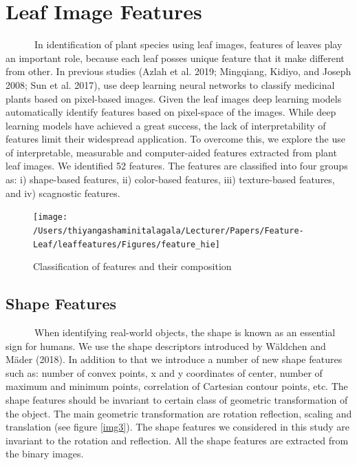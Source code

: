 \documentclass{article}
\begin{document}
\hypertarget{leaf-image-features}{%
\section{Leaf Image Features}\label{leaf-image-features}}

~~~~~~In identification of plant species using leaf images, features of
leaves play an important role, because each leaf posses unique feature
that it make different from other. In previous studies (Azlah et al.
2019; Mingqiang, Kidiyo, and Joseph 2008; Sun et al. 2017), use deep
learning neural networks to classify medicinal plants based on
pixel-based images. Given the leaf images deep learning models
automatically identify features based on pixel-space of the images.
While deep learning models have achieved a great success, the lack of
interpretability of features limit their widespread application. To
overcome this, we explore the use of interpretable, measurable and
computer-aided features extracted from plant leaf images. We identified
52 features. The features are classified into four groups as: i)
shape-based features, ii) color-based features, iii) texture-based
features, and iv) scagnostic features.

\begin{figure}[!ht]

{\centering \texttt{[image: /Users/thiyangashaminitalagala/Lecturer/Papers/Feature-Leaf/leaffeatures/Figures/feature\_hie]} 

}

\caption{\label{img33}Classification of features and their composition}\label{fig:unnamed-chunk-10}
\end{figure}

\hypertarget{shape-features}{%
\subsection{Shape Features}\label{shape-features}}

~~~~~~When identifying real-world objects, the shape is known as an
essential sign for humans. We use the shape descriptors introduced by
Wäldchen and Mäder (2018). In addition to that we introduce a number of
new shape features such as: number of convex points, x and y coordinates
of center, number of maximum and minimum points, correlation of
Cartesian contour points, etc. The shape features should be invariant to
certain class of geometric transformation of the object. The main
geometric transformation are rotation reflection, scaling and
translation (see figure \ref{img3}). The shape features we considered in
this study are invariant to the rotation and reflection. All the shape
features are extracted from the binary images.
\end{document}

